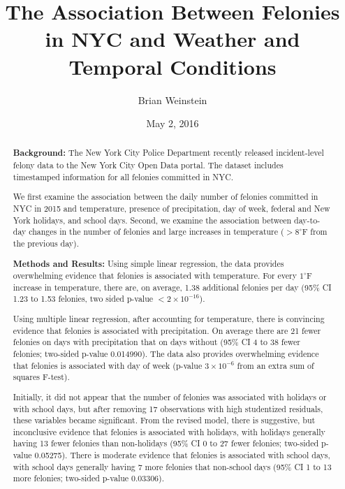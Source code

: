 \documentclass[11pt,notitlepage]{article}
\newcommand{\degf}{^\circ\text{F}}
\begin{document}
\title{The Association Between Felonies in NYC and Weather and Temporal Conditions}
\author{Brian Weinstein}
\date{May 2, 2016}

\maketitle



\begin{abstract}


\noindent \textbf{Background:} The New York City Police Department recently released incident-level felony data to the New York City Open Data portal. The dataset includes timestamped information for all felonies committed in NYC.

We first examine the association between the daily number of felonies committed in NYC in 2015 and temperature, presence of precipitation, day of week, federal and New York holidays, and school days. Second, we examine the association between day-to-day changes in the number of felonies and large increases in temperature ($>8 \degf$ from the previous day).

\noindent \textbf{Methods and Results:} Using simple linear regression, the data provides overwhelming evidence that felonies is associated with temperature. For every $1 \degf$ increase in temperature, there are, on average, 1.38 additional felonies per day (95\% CI 1.23 to 1.53 felonies, two sided p-value $<2\times10^{-16}$).

Using multiple linear regression, after accounting for temperature, there is convincing evidence that felonies is associated with precipitation. On average there are 21 fewer felonies on days with precipitation that on days without (95\% CI 4 to 38 fewer felonies; two-sided p-value 0.014990). The data also provides overwhelming evidence that felonies is associated with day of week (p-value $3 \times 10^{-6}$ from an extra sum of squares F-test).

Initially, it did not appear that the number of felonies was associated with holidays or with school days, but after removing 17 observations with high studentized residuals, these variables became significant. From the revised model, there is suggestive, but inconclusive evidence that felonies is associated with holidays, with holidays generally having 13 fewer felonies than non-holidays (95\% CI 0 to 27 fewer felonies; two-sided p-value 0.05275). There is moderate evidence that felonies is associated with school days, with school days generally having 7 more felonies that non-school days (95\% CI 1 to 13 more felonies; two-sided p-value 0.03306).


\end{abstract}
\end{document}
